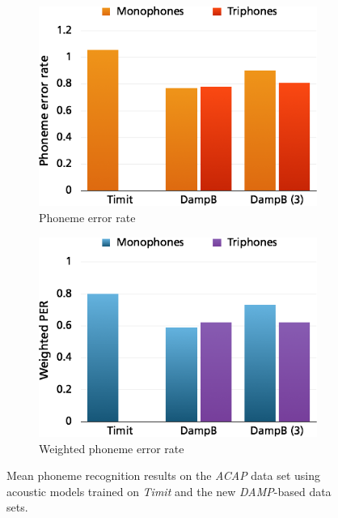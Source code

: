 \begin{figure}
	\centering
	\begin{subfigure}[t]{0.3\textwidth}
		\includegraphics[width=\textwidth]{images/res_phonerec_acap.png}
		\caption{Phoneme error rate}
		
	\end{subfigure}%
	\begin{subfigure}[t]{0.3\textwidth}
		\includegraphics[width=\textwidth]{images/res_phonerec_acap_w.png}
		\caption{Weighted phoneme error rate}
	\end{subfigure}
	\caption{Mean phoneme recognition results on the \textit{ACAP} data set using acoustic models trained on \textit{Timit} and the new \textit{DAMP}-based data sets.}\label{fig:res_phonerec_acap}
\end{figure}

